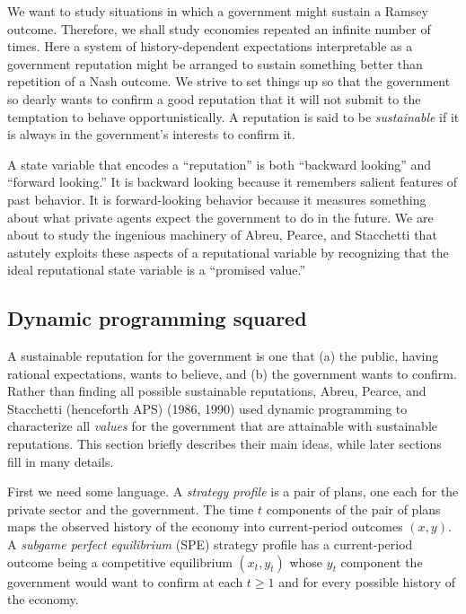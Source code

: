 We want to study situations in which a government might sustain a Ramsey
outcome.  Therefore, we shall study economies repeated an infinite number
of times.  Here a system of history-dependent expectations interpretable
as a government reputation might be arranged to sustain something better than
repetition of a Nash outcome.
We strive  to set things up so that the government so dearly  wants to
confirm a  good reputation that it will not submit to the temptation to
behave opportunistically.   A reputation is
said to be {\it sustainable\/} if it is always in the government's
interests to confirm it.



A state  variable that encodes a ``reputation'' is both
``backward looking'' and ``forward looking.''  It is
backward looking  because it remembers salient features of past  behavior.   It is  forward-looking behavior because it
measures something about what private agents expect the government to do in the future.
We are about to study the ingenious machinery of
Abreu, Pearce, and    Stacchetti that \newpage \noindent astutely exploits
these aspects of a reputational variable by recognizing that the ideal reputational state variable is a ``promised value.''


\subsection{Dynamic programming squared}
%
A sustainable reputation for the government is one that (a) the public, having rational expectations, wants to believe,
and (b) the government wants to confirm.
Rather than finding all possible sustainable reputations,
Abreu, Pearce, and Stacchetti  (henceforth APS) (1986, 1990) used dynamic
programming to characterize all {\it values\/} for the government that are
attainable  with sustainable reputations.  This section briefly describes
their main ideas, while later sections fill in many details.
    

First we need some language. A {\it strategy profile\/}
 is a pair of  plans, one
each for the private sector and the government.  The time $t$ components of the pair of plans maps the observed
history of the economy into current-period
outcomes $(x,y)$.  A {\it subgame perfect
equilibrium\/} (SPE)
strategy  profile  has a current-period outcome being
a competitive equilibrium
$(x_t,y_t)$ whose $y_t$ component
  the government would want
to confirm
at each $t \geq 1$ and for every
possible history of the economy.

